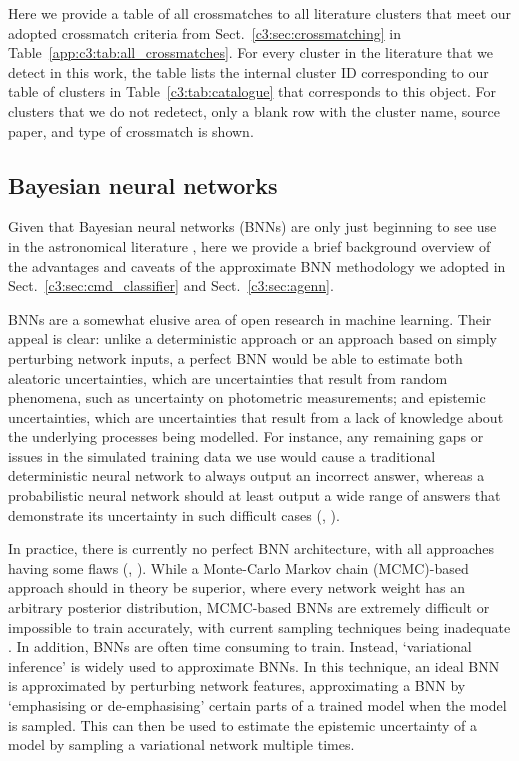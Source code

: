 Here we provide a table of all crossmatches to all literature clusters that meet our adopted crossmatch criteria from Sect.~\ref{c3:sec:crossmatching} in Table~\ref{app:c3:tab:all_crossmatches}. For every cluster in the literature that we detect in this work, the table lists the internal cluster ID corresponding to our table of clusters in Table~\ref{c3:tab:catalogue} that corresponds to this object. For clusters that we do not redetect, only a blank row with the cluster name, source paper, and type of crossmatch is shown.


\subsection{Bayesian neural networks}\label{app:c3:bayesian_nets}

Given that Bayesian neural networks (BNNs) are only just beginning to see use in the astronomical literature \citep[e.g.][]{huertas-company_hubble_2019}, here we provide a brief background overview of the advantages and caveats of the approximate BNN methodology we adopted in Sect.~\ref{c3:sec:cmd_classifier} and Sect.~\ref{c3:sec:agenn}.

BNNs are a somewhat elusive area of open research in machine learning. Their appeal is clear: unlike a deterministic approach or an approach based on simply perturbing network inputs, a perfect BNN would be able to estimate both aleatoric uncertainties, which are uncertainties that result from random phenomena, such as uncertainty on photometric measurements; and epistemic uncertainties, which are uncertainties that result from a lack of knowledge about the underlying processes being modelled. For instance, any remaining gaps or issues in the simulated training data we use would cause a traditional deterministic neural network to always output an incorrect answer, whereas a probabilistic neural network should at least output a wide range of answers that demonstrate its uncertainty in such difficult cases (\cite{goan_bayesian_2020}, \cite{jospin_hands-bayesian_2022}).

In practice, there is currently no perfect BNN architecture, with all approaches having some flaws (\cite{goan_bayesian_2020}, \cite{jospin_hands-bayesian_2022}). While a Monte-Carlo Markov chain (MCMC)-based approach should in theory be superior, where every network weight has an arbitrary posterior distribution, MCMC-based BNNs are extremely difficult or impossible to train accurately, with current sampling techniques being inadequate \citep{goan_bayesian_2020}. In addition, BNNs are often time consuming to train. Instead, `variational inference' is widely used to approximate BNNs. In this technique, an ideal BNN is approximated by perturbing network features, approximating a BNN by `emphasising or de-emphasising' certain parts of a trained model when the model is sampled. This can then be used to estimate the epistemic uncertainty of a model by sampling a variational network multiple times.

